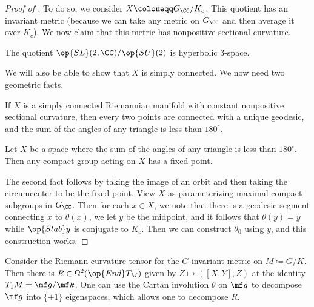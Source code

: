 \documentclass[../notes.tex]{subfiles}
\begin{document}
\begin{proof}[Proof of ]
	To do so, we consider $X\coloneqq G_\CC/K_c$. This quotient has an invariant metric (because we can take any metric on $G_\CC$ and then average it over $K_c$). We now claim that this metric has nonpositive sectional curvature.
	\begin{example}
		The quotient $\op{SL}(2,\CC)/\op{SU}(2)$ is hyperbolic $3$-space.
	\end{example}
	We will also be able to show that $X$ is simply connected. We now need two geometric facts.
	\begin{theorem}[Toponogov]
		If $X$ is a simply connected Riemannian manifold with constant nonpositive sectional curvature, then every two points are connected with a unique geodesic, and the sum of the angles of any triangle is less than $180^\circ$.
	\end{theorem}
	\begin{proposition}
		Let $X$ be a space where the sum of the angles of any triangle is less than $180^\circ$. Then any compact group acting on $X$ has a fixed point.
	\end{proposition}
	The second fact follows by taking the image of an orbit and then taking the circumcenter to be the fixed point. View $X$ as parameterizing maximal compact subgroups in $G_\CC$. Then for each $x\in X$, we note that there is a geodesic segment connecting $x$ to $\theta(x)$, we let $y$ be the midpoint, and it follows that $\theta(y)=y$ while $\op{Stab}y$ is conjugate to $K_c$. Then we can construct $\theta_0$ using $y$, and this construction works.
\end{proof}
\begin{remark}
	Consider the Riemann curvature tensor for the $G$-invariant metric on $M\coloneqq G/K$. Then there is $R\in\Omega^2(\op{End}T_M)$ given by $Z\mapsto([X,Y],Z)$ at the identity $T_1M=\mf g/\mf k$. One can use the Cartan involution $\theta$ on $\mf g$ to decompose $\mf g$ into $\{\pm1\}$ eigenspaces, which allows one to decompose $R$.
\end{remark}
\end{document}
